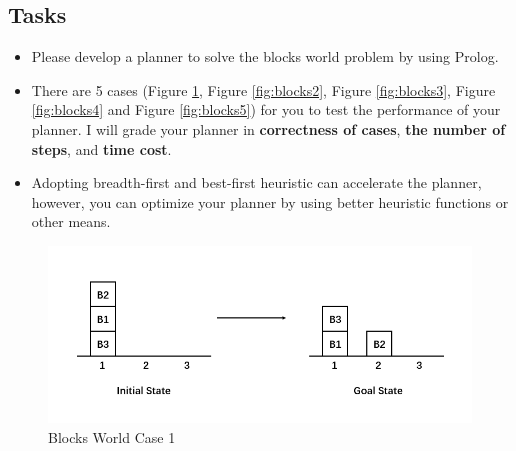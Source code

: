 ﻿\documentclass[a4paper, 11pt]{article}
\begin{document}
\subsection{Tasks}
\begin{itemize}
    \item Please develop a planner to solve the blocks world problem by using Prolog. 
    \item There are 5 cases (Figure \ref{fig:blocks1}, Figure \ref{fig:blocks2}, Figure \ref{fig:blocks3}, Figure \ref{fig:blocks4} and Figure \ref{fig:blocks5}) for you to test the performance of your planner. I will grade your planner in \textbf{correctness of cases}, \textbf{the number of steps}, and \textbf{time cost}. 
    \item Adopting breadth-first and best-first heuristic can accelerate the planner, however, you can optimize your planner by using better heuristic functions or other means.
\end{itemize}
\begin{figure}[ht]
  \centering
  \includegraphics[width=15cm]{Pic/blocks1}
  \caption{Blocks World Case 1}
  \label{fig:blocks1}
\end{figure}
\end{document}
